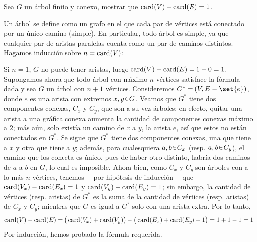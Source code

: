 \begin{ejer}
Sea $G$ un árbol finito y conexo, mostrar que $\operatorname{card}(V)-\operatorname{card}(E)=1$. 
\end{ejer}
\begin{sol}[Demostración]
Un árbol se define como un grafo en el que cada par de vértices está conectado por un único camino (simple). En particular, todo árbol es simple, ya que cualquier par de aristas paralelas cuenta como un par de caminos distintos. 
Hagamos inducción sobre $n = \operatorname{card}(V)$:\par
Si $n=1$, $G$ no puede tener aristas, luego
\(
\operatorname{card}(V) - \operatorname{card}(E) = 1-0 = 1.
\)
Supongamos ahora que todo árbol con máximo $n$ vértices satisface la fórmula dada y sea $G$ un árbol con $n+1$ vértices. Consideremos $G^* = (V,E-\set{e})$, donde $e$ es una arista con extremos $x,y \en G$. Veamos que $G^*$ tiene dos componentes conexas, $C_x$ y $C_y$, que son a su vez árboles: en efecto, quitar una arista a una gráfica conexa aumenta la cantidad de componentes conexas máximo a $2$; más aún, solo existía un camino de $x$ a $y$, la arista $e$, así que estos no están conectados en $G^*$. Se sigue que $G^*$ tiene dos componentes conexas, una que tiene a $x$ y otra que tiene a $y$; además, para cualesquiera $a,b \en C_x$ (resp. $a,b \en C_y$), el camino que los conecta es único, pues de haber otro distinto, habría dos caminos de $a$ a $b$ en $G$, lo cual es imposible. Ahora bien, como $C_x$ y $C_y$ son árboles con a lo más $n$ vértices, tenemos ---por hipótesis de inducción--- que $\operatorname{card}(V_x) - \operatorname{card}(E_x) =  1$ y $\operatorname{card}(V_y) - \operatorname{card}(E_y) =  1$; sin embargo, la cantidad de vértices (resp. aristas) de $G^*$ es la suma de la cantidad de vértices (resp. aristas) de $C_x$ y $C_y$; mientras que $G$ es igual a $G^*$ solo con una arista extra. Por lo tanto,
\[
\card(V) - \card(E)%
= \big(\card(V_x) + \card(V_y)\big) - \big(\card(E_x) + \card(E_y) + 1\big)%
= 1 + 1 - 1 = 1
\]
Por inducción, hemos probado la fórmula requerida. 
\end{sol}

